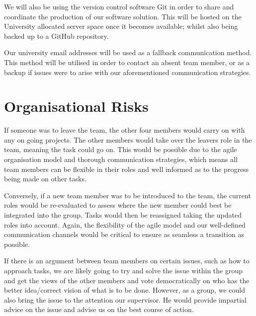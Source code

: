 \documentclass{article}
\begin{document}
We will also be using the version control software Git in order to share and coordinate the production of our software solution. This will be hosted on the University allocated server space once it becomes available; whilst also being backed up to a GitHub repository.



Our university email addresses will be used as a fallback communication method. This method will be utilised in order to contact an absent team member, or as a backup if issues were to arise with our aforementioned communication strategies.

\section{Organisational Risks}
If someone was to leave the team, the other four members would carry on with any on going projects. The other members would take over the leavers role in the team, meaning the task could go on. This would be possible due to the agile organisation model and thorough communication strategies, which means all team members can be flexible in their roles and well informed as to the progress being made on other tasks.

Conversely, if a new team member was to be introduced to the team, the current roles would be re-evaluated to assess where the new member could best be integrated into the group. Tasks would then be reassigned taking the updated roles into account. Again, the flexibility of the agile model and our well-defined communication channels would be critical to ensure as seamless a transition as possible. 

If there is an argument between team members on certain issues, such as how to approach tasks, we are likely going to try and solve the issue within the group and get the views of the other members and vote democratically on who has the better idea/correct vision of what is to be done. However, as a group, we could also bring the issue to the attention our supervisor. He would provide impartial advice on the issue and advise us on the best course of action.
\end{document}
